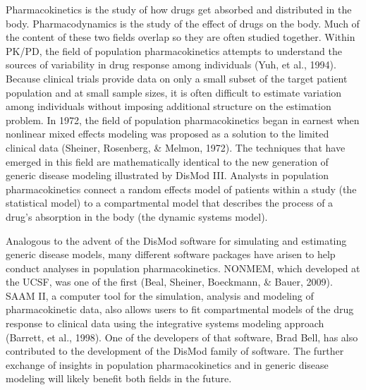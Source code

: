 Pharmacokinetics is the study of how drugs get absorbed and
distributed in the body. Pharmacodynamics is the study of the effect
of drugs on the body. Much of the content of these two fields overlap
so they are often studied together. Within PK/PD, the field of
population pharmacokinetics attempts to understand the sources of
variability in drug response among individuals (Yuh, et al.,
1994). Because clinical trials provide data on only a small subset of
the target patient population and at small sample sizes, it is often
difficult to estimate variation among individuals without imposing
additional structure on the estimation problem. In 1972, the field of
population pharmacokinetics began in earnest when nonlinear mixed
effects modeling was proposed as a solution to the limited clinical
data (Sheiner, Rosenberg, \& Melmon, 1972). The techniques that have
emerged in this field are mathematically identical to the new
generation of generic disease modeling illustrated by DisMod
III. Analysts in population pharmacokinetics connect a random effects
model of patients within a study (the statistical model) to a
compartmental model that describes the process of a drug's
absorption in the body (the dynamic systems model).

Analogous to the advent of the DisMod software for simulating and
estimating generic disease models, many different software packages
have arisen to help conduct analyses in population
pharmacokinetics. NONMEM, which developed at the UCSF, was one of the
first (Beal, Sheiner, Boeckmann, \& Bauer, 2009). SAAM II, a computer
tool for the simulation, analysis and modeling of pharmacokinetic
data, also allows users to fit compartmental models of the drug
response to clinical data using the integrative systems modeling
approach (Barrett, et al., 1998). One of the developers of that
software, Brad Bell, has also contributed to the development of the
DisMod family of software. The further exchange of insights in
population pharmacokinetics and in generic disease modeling will
likely benefit both fields in the future.


